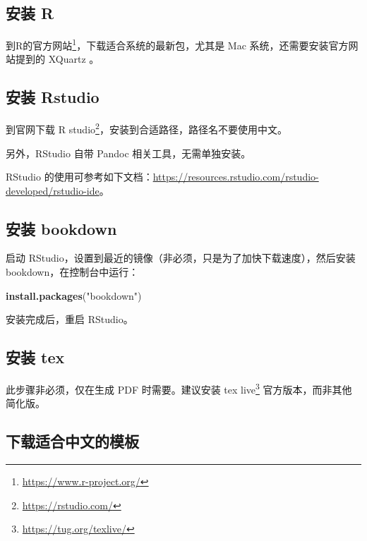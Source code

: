 \documentclass[]{ctexbook}
\newenvironment{Shaded}{\begin{snugshade}}{\end{snugshade}}
\newcommand{\KeywordTok}[1]{\textcolor[rgb]{0.13,0.29,0.53}{\textbf{#1}}}
\newcommand{\NormalTok}[1]{#1}
\newcommand{\StringTok}[1]{\textcolor[rgb]{0.31,0.60,0.02}{#1}}
\renewcommand{\href}[2]{#2\footnote{\url{#1}}}
\begin{document}
\hypertarget{ux5b89ux88c5-r}{%
\subsection{安装 R}\label{ux5b89ux88c5-r}}

到\href{https://www.r-project.org/}{R的官方网站}，下载适合系统的最新包，尤其是 Mac 系统，还需要安装官方网站提到的 XQuartz 。

\hypertarget{ux5b89ux88c5-rstudio}{%
\subsection{安装 Rstudio}\label{ux5b89ux88c5-rstudio}}

到官网下载 \href{https://rstudio.com/}{R studio}，安装到合适路径，路径名不要使用中文。

另外，RStudio 自带 Pandoc 相关工具，无需单独安装。

RStudio 的使用可参考如下文档：\url{https://resources.rstudio.com/rstudio-developed/rstudio-ide}。

\hypertarget{ux5b89ux88c5-bookdown}{%
\subsection{安装 bookdown}\label{ux5b89ux88c5-bookdown}}

启动 RStudio，设置到最近的镜像（非必须，只是为了加快下载速度），然后安装 bookdown，在控制台中运行：

\begin{Shaded}
\begin{Highlighting}[]
\KeywordTok{install.packages}\NormalTok{(}\StringTok{"bookdown"}\NormalTok{)}
\end{Highlighting}
\end{Shaded}

安装完成后，重启 RStudio。

\hypertarget{ux5b89ux88c5-tex}{%
\subsection{安装 tex}\label{ux5b89ux88c5-tex}}

此步骤非必须，仅在生成 PDF 时需要。建议安装 \href{https://tug.org/texlive/}{tex live} 官方版本，而非其他简化版。

\hypertarget{ux4e0bux8f7dux9002ux5408ux4e2dux6587ux7684ux6a21ux677f}{%
\subsection{下载适合中文的模板}\label{ux4e0bux8f7dux9002ux5408ux4e2dux6587ux7684ux6a21ux677f}}
\end{document}
